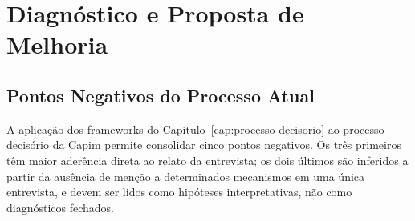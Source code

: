 
\chapter{Diagnóstico e Proposta de Melhoria}
\label{cap:diagnostico-proposta}

\section{Pontos Negativos do Processo Atual}
\label{sec:pontos-negativos}

A aplicação dos frameworks do Capítulo~\ref{cap:processo-decisorio} ao processo decisório da Capim permite consolidar cinco pontos negativos. Os três primeiros têm maior aderência direta ao relato da entrevista; os dois últimos são inferidos a partir da ausência de menção a determinados mecanismos em uma única entrevista, e devem ser lidos como hipóteses interpretativas, não como diagnósticos fechados.

